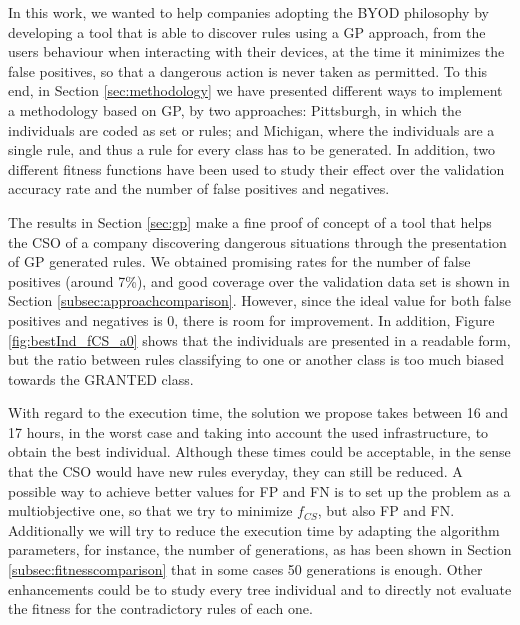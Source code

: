 \documentclass[runningheads]{llncs}
\begin{document}

In this work, we wanted to help companies adopting the BYOD philosophy
by developing a tool that is able to discover rules using a GP
approach, from the users behaviour when interacting with their
devices, at the time it minimizes the false positives, so that a
dangerous action is never taken as permitted. To this end, in Section \ref{sec:methodology} we have
presented different ways to implement a methodology based on GP, by two
approaches: Pittsburgh, in which the individuals are coded as set or
rules; and Michigan, where the individuals are a single rule, and thus
a rule for every class has to be generated. In addition, two different
fitness functions have been used to study their effect over the
validation accuracy rate and the number of false positives and
negatives.

The results in Section \ref{sec:gp} make a fine proof of concept of a tool that helps the CSO of a company discovering dangerous situations through the presentation of GP generated rules. We obtained promising rates for the number of false positives (around
7\%), and good coverage over the validation data set is shown in
Section \ref{subsec:approachcomparison}. However, since the ideal
value for both false positives and negatives is 0, there is room for
improvement. In addition, Figure \ref{fig:bestInd_fCS_a0} shows
that the individuals are presented in a readable form, but the ratio
between rules classifying to one or another class is too much biased
towards the GRANTED class. %

With regard to the execution time, the solution we propose takes between 16 and 17 hours, in the worst case and taking into account the used infrastructure, to obtain the best individual. Although these times could be acceptable, in the sense that the CSO would have new rules everyday, they can still be reduced.  
A possible way to
achieve better values for FP and FN is to set up the problem as a
multiobjective one, so that we try to minimize $f_{CS}$, but also FP
and FN. Additionally we will try to reduce the execution time by adapting the algorithm parameters, for instance, the number of generations, as has been shown in Section \ref{subsec:fitnesscomparison} that in some cases 50 generations is enough. Other enhancements could be to study every tree individual and to directly not evaluate the fitness for the contradictory rules of each one. 
\end{document}
